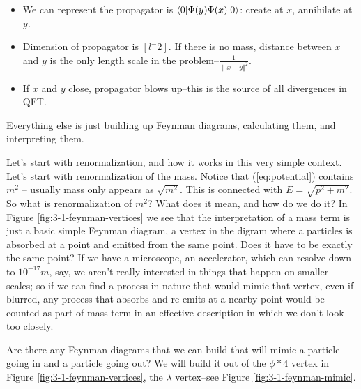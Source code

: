 \documentclass[]{article}
\begin{document}
\begin{itemize}
	\item We can represent the propagator is  $\braket{0|\Phi(y)\Phi(x)|0}$: create at $x$, annihilate at $y$.
	\item Dimension of propagator is $[l^-2]$. If there is no mass, distance between $x$ and $y$ is the only length scale in the problem--$\frac{1}{\lVert x-y \Vert^2}$. 
	\item If $x$ and $y$ close, propagator blows up--this is the source of all divergences in QFT.
\end{itemize}

Everything else is just building up Feynman diagrams, calculating them, and interpreting them.

Let's start with renormalization, and how it works in this very simple context.
Let's start with renormalization of the mass. Notice that (\ref{eq:potential}) contains $m^2$ -- usually mass only appears as $\sqrt{m^2}$. This is connected with $E=\sqrt{p^2 + m^2}$. So what is renormalization of $m^2$? What does it mean, and how do we do it? In Figure \ref{fig:3-1-feynman-vertices} we see that the interpretation of a mass term is just a basic simple Feynman diagram, a vertex in the digram where a particles is absorbed at a point and emitted from the same point. Does it have to be exactly the same point? If we have a microscope, an accelerator, which can resolve down to $10^{-17}m$, say, we aren't really interested in things that happen on smaller scales; so if we can find a process in nature that would mimic that vertex,  even if blurred, any process that absorbs and re-emits at a nearby point would be counted as part of mass term in an effective description in which we don't look too closely.

Are there any Feynman diagrams that we can build that will mimic a particle going in and a particle going out? We will build it out of the $\phi*4$ vertex in Figure \ref{fig:3-1-feynman-vertices}, the $\lambda$ vertex--see Figure \ref{fig:3-1-feynman-mimic}.
\end{document}
